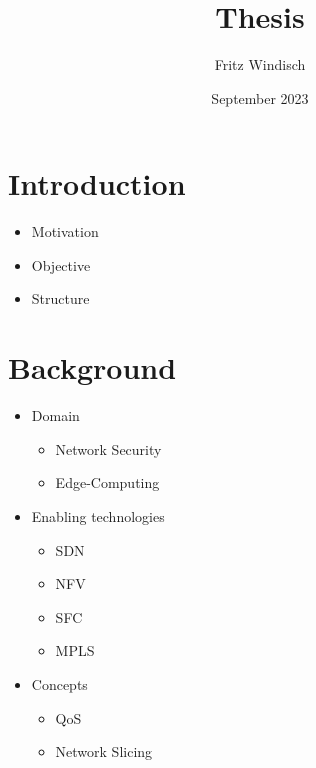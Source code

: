 \documentclass{article}
\title{Thesis}
\author{Fritz Windisch}
\date{September 2023}
\begin{document}
\maketitle

\section{Introduction}
\begin{itemize}
    \item Motivation
    \item Objective
    \item Structure
\end{itemize}

\section{Background}
\iffalse
\begin{itemize}
    \item Domain
    \begin{itemize}
        \item Network Security
        \item Edge-Computing
    \end{itemize}
    \item Enabling technologies
    \begin{itemize}
        \item SDN
        \item NFV
        \item SFC
        \item MPLS
    \end{itemize}
    \item Concepts
    \begin{itemize}
        \item QoS
        \item Network Slicing
    \end{itemize}
\end{itemize}
\end{document}
